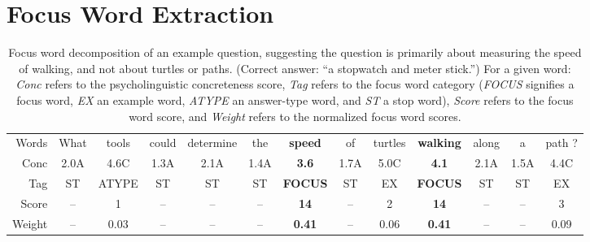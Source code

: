 \section{Focus Word Extraction}
\label{sec:focuswords}


%
%
\begin{table*}[t]
\caption{{Focus word decomposition of an example question, suggesting the question is primarily about measuring the speed of walking, and not about turtles or paths. (Correct answer: ``a stopwatch and meter stick.'') 
For a given word: 
\emph{Conc} refers to the psycholinguistic concreteness score,
\emph{Tag} refers to the focus word category (\emph{FOCUS} signifies a focus word, \emph{EX} an example word, \emph{ATYPE} an answer-type word, and \emph{ST} a stop word),
\emph{Score} refers to the focus word score, and
\emph{Weight} refers to the normalized focus word scores. 
}}
\begin{center}
\begin{footnotesize}
\addtolength{\tabcolsep}{-1.7pt}  
\begin{tabular}{r|cccccccccccc}
Words & What	& tools	& could & determine & the  & {\bf speed} & of   & turtles & {\bf walking} & along & a    & path ? 		\\
Conc  & 2.0A    & 4.6C  & 1.3A  & 2.1A      & 1.4A & {\bf 3.6}   & 1.7A & 5.0C    & {\bf 4.1}     & 2.1A  & 1.5A & 4.4C 		\\
Tag	  & ST      & ATYPE & ST    & ST        & ST   & {\bf FOCUS} & ST   & EX      & {\bf FOCUS}   & ST    & ST   & EX   		\\
Score & --      & 1     & --    & --        & --   & {\bf 14}    & --   & 2       & {\bf 14}      & --    & --   & 3			\\
Weight& --      & 0.03  & --    & --        & --   & {\bf 0.41}  & --   & 0.06    & {\bf 0.41}    & --    & --   & 0.09		\\
\end{tabular}
\addtolength{\tabcolsep}{1.7pt}  
\end{footnotesize}

\label{tab:focusexample}
\end{center}
\end{table*}


